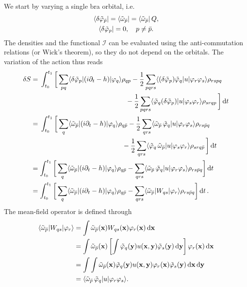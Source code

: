 \documentclass[aip,jcp,preprint,superscriptaddress,nofootinbib]{revtex4-1}
\begin{document}
We start by varying a single bra orbital, i.e.
\begin{subequations}
    \begin{gather}
        \bra{\delta\tilde{\varphi}_{\bar{p}}} = \bra{\tilde{\omega}_{\bar{p}}} = \bra{\tilde{\omega}_{\bar{p}}} Q, \\
        \bra{\delta\tilde{\varphi}_{p}} = 0, \quad p \neq \bar{p}.
    \end{gather}
\end{subequations}
The densities and the functional $\mathcal{I}$ can be evaluated using the anti-commutation relations (or Wick's theorem), so they do not
depend on the orbitals. The variation of the action thus reads
\begin{align} \label{eq:Q_space_variation_bra}
    \delta S 
    &= 
    \begin{multlined}[t]
        \int_{t_0}^{t_1}
        \bigg[
            \sum_{pq} \elm{\phibravar{p}}{(i \partial_t - h)}{\phiket{q}} \rho_{qp} 
            - \frac{1}{2} \sum_{pqrs} \elm{(\phibravar{p}) \phibra{q}}{u}{\phiket{r} \phiket{s}} \rho_{rspq}  \\
            - \frac{1}{2} \sum_{pqrs} \elm{\phibra{q} (\phibravar{p})}{u}{\phiket{s} \phiket{r}} \rho_{srqp} \,
        \bigg] \dd{t} 
    \end{multlined} \nn
    &= 
    \begin{multlined}[t]
        \int_{t_0}^{t_1}
        \bigg[
            \sum_{q} \elm{\tilde{\omega}_{\bar{p}}}{(i \partial_t - h)}{\phiket{q}} \rho_{q\bar{p}} 
            - \frac{1}{2} \sum_{qrs} \elm{\tilde{\omega}_{\bar{p}} \, \phibra{q}}{u}{\phiket{r} \phiket{s}} \rho_{rs\bar{p}q} \\
            - \frac{1}{2} \sum_{qrs} \elm{\phibra{q} \, \tilde{\omega}_{\bar{p}}}{u}{\phiket{s} \phiket{r}} \rho_{srq\bar{p}} \,
        \bigg] \dd{t} 
    \end{multlined} \nn
    &=
    \int_{t_0}^{t_1}
    \bigg[
        \sum_{q} \elm{\tilde{\omega}_{\bar{p}}}{(i \partial_t - h)}{\phiket{q}} \rho_{q\bar{p}}
        - \sum_{qrs} \elm{\tilde{\omega}_{\bar{p}} \, \phibra{q}}{u}{\phiket{r} \phiket{s}} \rho_{rs\bar{p}q}
    \bigg] \dd{t} \nn
    &=
    \int_{t_0}^{t_1}
    \bigg[
        \sum_{q} \elm{\tilde{\omega}_{\bar{p}}}{(i \partial_t - h)}{\phiket{q}} \rho_{q\bar{p}}
        - \sum_{qrs} \elm{\tilde{\omega}_{\bar{p}}}{ W_{qs} }{\phiket{r}} \rho_{rs\bar{p}q}
    \bigg] \dd{t}.
\end{align}
The mean-field operator is defined through
\begin{align}
    \langle \tilde{\omega}_{\bar{p}} \vert  W_{qs}  \vert \varphi_{r} \rangle
    &= \int \tilde{\omega}_{\bar{p}} (\mathbf{x}) W_{qs} (\mathbf{x}) \varphi_{r} (\mathbf{x}) \dd{\mathbf{x}} \nonumber\\
    &= \int \tilde{\omega}_{\bar{p}} (\mathbf{x}) 
    \left[\int \tilde{\varphi}_{q} (\mathbf{y}) u(\mathbf{x}, \mathbf{y}) \tilde{\varphi}_{s} (\mathbf{y}) \dd{\mathbf{y}}\right]
    \varphi_{r} (\mathbf{x}) \dd{\mathbf{x}} \nonumber\\ 
    &= \int \int 
    \tilde{\omega}_{\bar{p}} (\mathbf{x}) 
    \tilde{\varphi}_{q} (\mathbf{y}) 
    u(\mathbf{x}, \mathbf{y}) 
    \varphi_{r} (\mathbf{x}) 
    \tilde{\varphi}_{s} (\mathbf{y})
    \dd{\mathbf{x}} \dd{\mathbf{y}} \nonumber\\
    &= \langle \tilde{\omega}_{\bar{p}} \, \tilde{\varphi}_{q} \vert u \vert \varphi_{r} \varphi_{s} \rangle.
\end{align}
\end{document}
